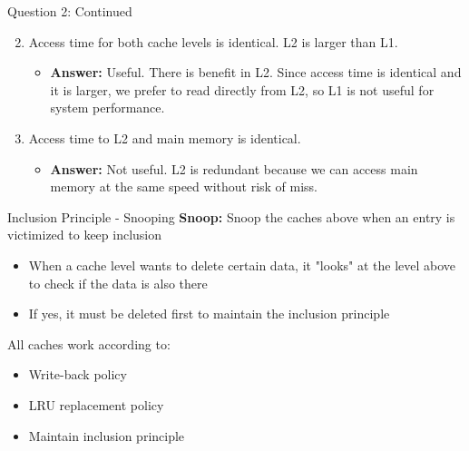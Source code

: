 \documentclass[aspectratio=169,12pt]{beamer}
\begin{document}
\begin{frame}{Question 2: Continued}
\begin{enumerate}
    \setcounter{enumi}{1}
    \item Access time for both cache levels is identical. L2 is larger than L1.
    \begin{itemize}
        \item \textbf{Answer:} Useful. There is benefit in L2. Since access time is identical and it is larger, we prefer to read directly from L2, so L1 is not useful for system performance.
    \end{itemize}
    
    \item Access time to L2 and main memory is identical.
    \begin{itemize}
        \item \textbf{Answer:} Not useful. L2 is redundant because we can access main memory at the same speed without risk of miss.
    \end{itemize}
\end{enumerate}
\end{frame}

\begin{frame}{Inclusion Principle - Snooping}
\textbf{Snoop:} Snoop the caches above when an entry is victimized to keep inclusion

\begin{itemize}
    \item When a cache level wants to delete certain data, it "looks" at the level above to check if the data is also there
    \item If yes, it must be deleted first to maintain the inclusion principle
\end{itemize}

All caches work according to:
\begin{itemize}
    \item Write-back policy
    \item LRU replacement policy
    \item Maintain inclusion principle
\end{itemize}
\end{frame}
\end{document}
